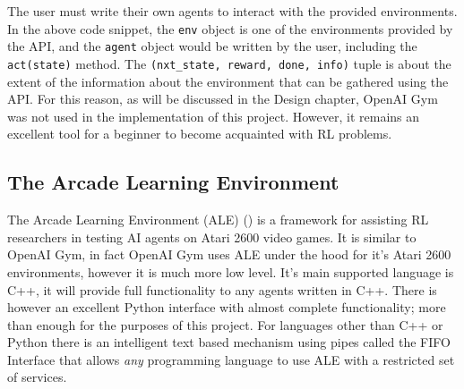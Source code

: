 The user must write their own agents to interact with the provided environments. In the above code snippet, the \texttt{env} object is one of the environments provided by the API, and the \texttt{agent} object would be written by the user, including the \texttt{act(state)} method. The \texttt{(nxt\_state, reward, done, info)} tuple is about the extent of the information about the environment that can be gathered using the API. For this reason, as will be discussed in the Design chapter, OpenAI Gym was not used in the implementation of this project. However, it remains an excellent tool for a beginner to become acquainted with RL problems.

\subsection{The Arcade Learning Environment}
The Arcade Learning Environment (ALE) (\cite{ale-eval-plat}) is a framework for assisting RL researchers in testing AI agents on Atari 2600 video games. It is similar to OpenAI Gym, in fact OpenAI Gym uses ALE under the hood for it's Atari 2600 environments, however it is much more low level. It's main supported language is C++, it will provide full functionality to any agents written in C++. There is however an excellent Python interface with almost complete functionality; more than enough for the purposes of this project. For languages other than C++ or Python there is an intelligent text based mechanism using pipes called the FIFO Interface that allows \textit{any} programming language to use ALE with a restricted set of services. \paragraph{}

